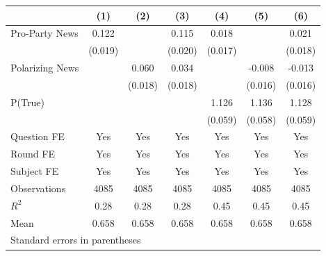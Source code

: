 \begin{tabular}{l*{6}{c}}
\hline\hline
                    &\multicolumn{1}{c}{(1)}&\multicolumn{1}{c}{(2)}&\multicolumn{1}{c}{(3)}&\multicolumn{1}{c}{(4)}&\multicolumn{1}{c}{(5)}&\multicolumn{1}{c}{(6)}\\
\hline
Pro-Party News      &    0.122&         &    0.115&    0.018&         &    0.021\\
                    &  (0.019)&         &  (0.020)&  (0.017)&         &  (0.018)\\
Polarizing News     &         &    0.060&    0.034&         &   -0.008&   -0.013\\
\hspace{9mm}        &         &  (0.018)&  (0.018)&         &  (0.016)&  (0.016)\\
P(True)             &         &         &         &    1.126&    1.136&    1.128\\
                    &         &         &         &  (0.059)&  (0.058)&  (0.059)\\
Question FE         &      Yes&      Yes&      Yes&      Yes&      Yes&      Yes\\
Round FE            &      Yes&      Yes&      Yes&      Yes&      Yes&      Yes\\
Subject FE          &      Yes&      Yes&      Yes&      Yes&      Yes&      Yes\\
\hline
Observations        &     4085&     4085&     4085&     4085&     4085&     4085\\
\(R^{2}\)           &     0.28&     0.28&     0.28&     0.45&     0.45&     0.45\\
Mean                &    0.658&    0.658&    0.658&    0.658&    0.658&    0.658\\
\hline\hline
\multicolumn{7}{l}{\footnotesize Standard errors in parentheses}\\
\end{tabular}
